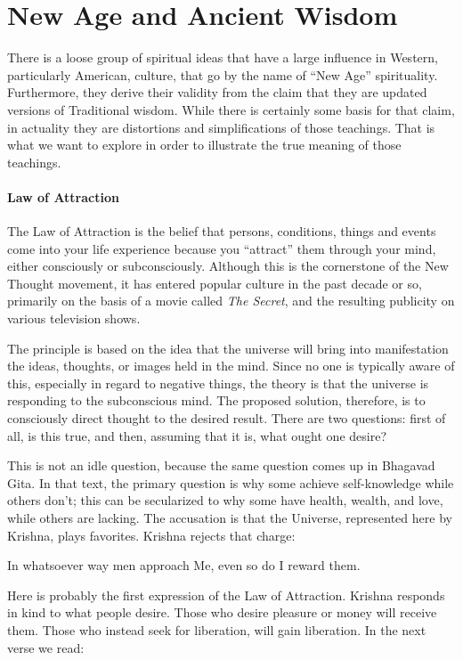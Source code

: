 \section{New Age and Ancient Wisdom}

There is a loose group of spiritual ideas that have a large influence in Western, particularly American, culture, that go by the name of “New Age” spirituality. Furthermore, they derive their validity from the claim that they are updated versions of Traditional wisdom. While there is certainly some basis for that claim, in actuality they are distortions and simplifications of those teachings. That is what we want to explore in order to illustrate the true meaning of those teachings.

\paragraph{Law of Attraction}
The Law of Attraction is the belief that persons, conditions, things and events come into your life experience because you “attract” them through your mind, either consciously or subconsciously. Although this is the cornerstone of the New Thought movement, it has entered popular culture in the past decade or so, primarily on the basis of a movie called \emph{The Secret}, and the resulting publicity on various television shows.

The principle is based on the idea that the universe will bring into manifestation the ideas, thoughts, or images held in the mind. Since no one is typically aware of this, especially in regard to negative things, the theory is that the universe is responding to the subconscious mind. The proposed solution, therefore, is to consciously direct thought to the desired result. There are two questions: first of all, is this true, and then, assuming that it is, what ought one desire?

This is not an idle question, because the same question comes up in Bhagavad Gita. In that text, the primary question is why some achieve self-knowledge while others don't; this can be secularized to why some have health, wealth, and love, while others are lacking. The accusation is that the Universe, represented here by Krishna, plays favorites. Krishna rejects that charge:

\begin{quotex}
In whatsoever way men approach Me, even so do I reward them. 

\end{quotex}
Here is probably the first expression of the Law of Attraction. Krishna responds in kind to what people desire. Those who desire pleasure or money will receive them. Those who instead seek for liberation, will gain liberation. In the next verse we read:

